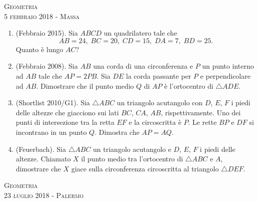 \documentclass[a4paper]{article}
\theoremstyle{remark}
\theoremstyle{definition}
\begin{document}
\newpage
\begin{center}
	\vspace*{0,5 cm}
	{\Huge \textsc{Geometria}} \\
	\vspace{0,5 cm}
	\textsc{\Author} \hspace{1cm} \textsc{5 febbraio 2018 - Massa}
	\thispagestyle{empty}
	\vspace{0,7 cm}
\end{center}
\normalsize

\begin{enumerate}
	\item (Febbraio 2015).  Sia $ ABCD $ un quadrilatero tale che $$  AB = 24 ,\; BC = 20 ,\; CD = 15 ,\; DA = 7 ,\; BD = 25 . $$ Quanto è lungo $ AC $? 
	
	\item (Febbraio 2008). Sia $ AB $ una corda di una circonferenza e $ P $ un punto interno ad $ AB $ tale che $ AP = 2PB $. Sia $ DE $ la corda passante per $ P $ e perpendicolare ad $ AB $. Dimostrare che il punto medio $ Q $ di $ AP $ è l’ortocentro di $ \bigtriangleup ADE $. 
	
	\item (Shortlist 2010/G1). Sia $\bigtriangleup ABC $ un triangolo acutangolo con $ D $, $ E $, $ F $ i piedi delle altezze che giacciono sui lati $ BC $, $ CA $, $ AB $, rispettivamente. Uno dei punti di intersezione tra la retta $ EF $ e la circoscritta è $ P $. Le rette $ BP $ e $ DF $ si incontrano in un punto $ Q $. Dimostra che $ AP = AQ $.
	
	\item (Feuerbach). Sia $ \bigtriangleup ABC $ un triangolo acutangolo e $ D $, $ E $, $ F $ i piedi delle altezze. Chiamato $ X $ il punto medio tra l'ortocentro di $\bigtriangleup ABC $ e $ A $, dimostrare che $ X $ giace sulla circonferenza circoscritta al triangolo $\bigtriangleup DEF $.
	
	
\end{enumerate}

\newpage
\begin{center}
	\vspace*{0,5 cm}
	{\Huge \textsc{Geometria}} \\
	\vspace{0,5 cm}
	\textsc{\Author} \hspace{1cm} \textsc{23 luglio 2018 - Palermo}
	\thispagestyle{empty}
	\vspace{0,7 cm}
\end{center}
\normalsize
\end{document}
